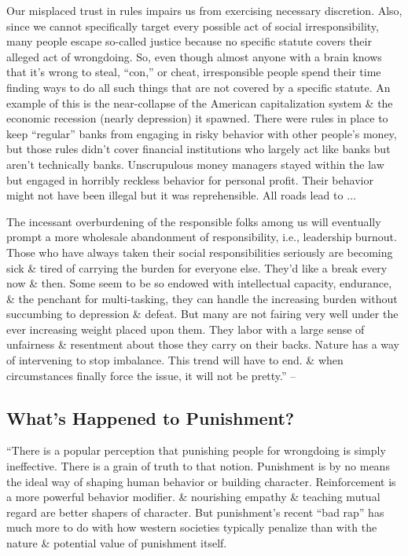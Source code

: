 \documentclass{article}
\numberwithin{equation}{section}
\begin{document}
Our misplaced trust in rules impairs us from exercising necessary discretion. Also, since we cannot specifically target every possible act of social irresponsibility, many people escape so-called justice because no specific statute covers their alleged act of wrongdoing. So, even though almost anyone with a brain knows that it's wrong to steal, ``con,'' or cheat, irresponsible people spend their time finding ways to do all such things that are not covered by a specific statute. An example of this is the near-collapse of the American capitalization system \& the economic recession (nearly depression) it spawned. There were rules in place to keep ``regular'' banks from engaging in risky behavior with other people's money, but those rules didn't cover financial institutions who largely act like banks but aren't technically banks. Unscrupulous money managers stayed within the law but engaged in horribly reckless behavior for personal profit. Their behavior might not have been illegal but it was reprehensible. All roads lead to $\ldots$

The incessant overburdening of the responsible folks among us will eventually prompt a more wholesale abandonment of responsibility, i.e., leadership burnout. Those who have always taken their social responsibilities seriously are becoming sick \& tired of carrying the burden for everyone else. They'd like a break every now \& then. Some seem to be so endowed with intellectual capacity, endurance, \& the penchant for multi-tasking, they can handle the increasing burden without succumbing to depression \& defeat. But many are not fairing very well under the ever increasing weight placed upon them. They labor with a large sense of unfairness \& resentment about those they carry on their backs. Nature has a way of intervening to stop imbalance. This trend will have to end. \& when circumstances finally force the issue, it will not be pretty.'' -- \cite[pp. 235--237]{Simon2011}

\subsection{What's Happened to Punishment?}
``There is a popular perception that punishing people for wrongdoing is simply ineffective. There is a grain of truth to that notion. Punishment is by no means the ideal way of shaping human behavior or building character. Reinforcement is a more powerful behavior modifier. \& nourishing empathy \& teaching mutual regard are better shapers of character. But punishment's recent ``bad rap'' has much more to do with how western societies typically penalize than with the nature \& potential value of punishment itself.
\end{document}
